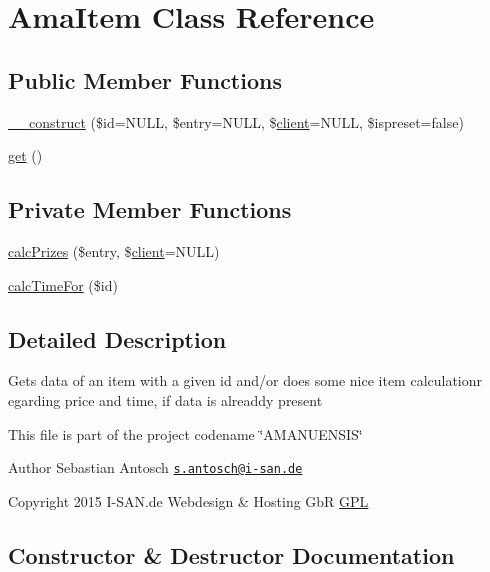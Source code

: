\hypertarget{a00004}{}\section{Ama\+Item Class Reference}
\label{a00004}
\subsection*{Public Member Functions}
\begin{DoxyCompactItemize}
\item 
\hyperlink{a00004_aaab12cd90b4dccbb52c145d20ad5ba7a}{\+\_\+\+\_\+construct} (\$id=N\+U\+L\+L, \$entry=N\+U\+L\+L, \$\hyperlink{a00015}{client}=N\+U\+L\+L, \$ispreset=false)
\item 
\hyperlink{a00004_ac33ee765f5ad9f134540bac393721cfe}{get} ()
\end{DoxyCompactItemize}
\subsection*{Private Member Functions}
\begin{DoxyCompactItemize}
\item 
\hyperlink{a00004_a5686932434d6d86e472ce3d6e68e74b4}{calc\+Prizes} (\$entry, \$\hyperlink{a00015}{client}=N\+U\+L\+L)
\item 
\hyperlink{a00004_ad754c3635e6c74fba02bb32ee6b78688}{calc\+Time\+For} (\$id)
\end{DoxyCompactItemize}


\subsection{Detailed Description}
Gets data of an item with a given id and/or does some nice item calculationr egarding price and time, if data is alreaddy present

This file is part of the project codename \char`\"{}\+A\+M\+A\+N\+U\+E\+N\+S\+I\+S\char`\"{}

\begin{DoxyAuthor}{Author}
Sebastian Antosch \href{mailto:s.antosch@i-san.de}{\tt s.\+antosch@i-\/san.\+de} 
\end{DoxyAuthor}
\begin{DoxyCopyright}{Copyright}
2015 I-\/\+S\+A\+N.\+de Webdesign \& Hosting Gb\+R \hyperlink{}{G\+P\+L }
\end{DoxyCopyright}


\subsection{Constructor \& Destructor Documentation}
\hypertarget{a00004_aaab12cd90b4dccbb52c145d20ad5ba7a}{}
